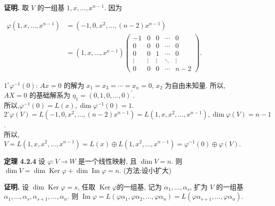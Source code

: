 \documentclass[14pt]{beamer}
\begin{document}
\begin{frame}{}
	\textbf{证明.} 取 $V$ 的一组基  $1,x, \ldots, x^{n-1}$. 因为 
	\begin{small}
		$\begin{aligned}\varphi(1,x, \ldots, x^{n-1})&=(-1,0,x^{2},\ldots,(n-2)x^{n-1})\\&=(1,x, \ldots, x^{n-1})\begin{pmatrix} -1 & 0 & 0 & \cdots  & 0\\  0& 0 & 0 & \cdots & 0\\ 0 & 0 & 1 & \cdots & 0\\ \vdots  & \vdots & \vdots & \ddots  & \vdots\\  0& 0 &  0& \cdots &n-2\end{pmatrix}.\end{aligned}$
	\end{small}
	$1^{\circ} \varphi^{-1}(0)$: $A x=0$ 的解为  $x_{1}=x_{3}=\cdots=x_{n}=0$, $x_{2}$ 为自由未知量. 所以, $A X=0$  的基础解系为  $\eta_{1}=(0,1,0, \ldots, 0)^{\prime}$.\\
	所以,$\varphi^{-1}(0)=L(x), \operatorname{dim}\varphi^{-1}(0)=1$.\\
	$2^{\circ}\varphi(V)=L(-1,0,x^{2},\ldots,(n-2)x^{n-1})=L\left(1, x, x^{2}, \ldots, x^{n-1}\right), \operatorname{dim}\varphi(V)=n-1$.\\
	所以, $V=L\left(1,x,x^{2}, \ldots, x^{n-1}\right)=L(x) \oplus L\left(1, x^{2}, \ldots, x^{n-1}\right)=\varphi^{-1}(0) \oplus \varphi(V).$
\end{frame}

\begin{frame}{}
	\textbf{定理 4.2.4} 设  $\varphi: V \rightarrow W$  是一个线性映射, 且 $\operatorname{dim}V=n$. 则 $\operatorname{dim} V=\operatorname{dim}\operatorname{Ker} \varphi + \operatorname{dim}\operatorname{Im} \varphi=n$. (方法:设小扩大)
	
	\textbf{证明.} 设 $\operatorname{dim}\operatorname{Ker} \varphi=s$, 任取 $\operatorname{Ker} \varphi$的一组基, 记为 $\alpha_{1}, \ldots, \alpha_{s}
	$, 扩为 $V$ 的一组基 $\alpha_1, \ldots, \alpha_{s}, \alpha_{s+1}, \ldots, \alpha_{n}$. 则 $\operatorname{Im} \varphi=L(\varphi \alpha_{1}, \varphi \alpha_{2}, \ldots, \varphi \alpha_{n})=L(\varphi \alpha_{s+1}, \ldots, \varphi \alpha_{n})$.
\end{frame}
\end{document}
